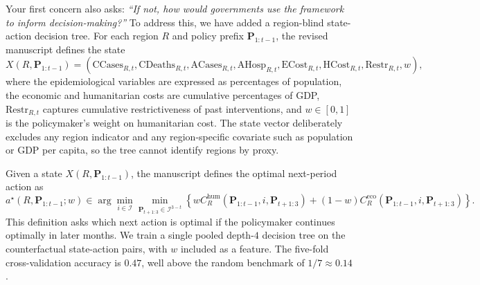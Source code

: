 \documentclass[letterpaper,twoside,11pt]{reviewresponse}
\begin{document}
Your first concern also asks: \emph{``If not, how would governments use the framework to inform decision-making?''} To address this, we have added a region-blind state-action decision tree. For each region $R$ and policy prefix $\bm{P}_{1:t-1}$, the revised manuscript defines the state
\[
X(R,\bm{P}_{1:t-1})
=
\left(
\mathrm{CCases}_{R,t},
\mathrm{CDeaths}_{R,t},
\mathrm{ACases}_{R,t},
\mathrm{AHosp}_{R,t},
\mathrm{ECost}_{R,t},
\mathrm{HCost}_{R,t},
\mathrm{Restr}_{R,t},
w
\right),
\]
where the epidemiological variables are expressed as percentages of population, the economic and humanitarian costs are cumulative percentages of GDP, $\mathrm{Restr}_{R,t}$ captures cumulative restrictiveness of past interventions, and $w\in[0,1]$ is the policymaker's weight on humanitarian cost. The state vector deliberately excludes any region indicator and any region-specific covariate such as population or GDP per capita, so the tree cannot identify regions by proxy.

Given a state $X(R,\bm{P}_{1:t-1})$, the manuscript defines the optimal next-period action as
\[
a^\star(R,\bm{P}_{1:t-1};w)
\in \arg\min_{i\in\mathcal{I}}
\min_{\bm{P}_{t+1:3}\in\mathcal{I}^{3-t}}
\left\{
w C^{\mathrm{hum}}_R(\bm{P}_{1:t-1},i,\bm{P}_{t+1:3})
+(1-w)C^{\mathrm{eco}}_R(\bm{P}_{1:t-1},i,\bm{P}_{t+1:3})
\right\}.
\]
This definition asks which next action is optimal if the policymaker continues optimally in later months. We train a single pooled depth-$4$ decision tree on the counterfactual state-action pairs, with $w$ included as a feature. The five-fold cross-validation accuracy is $0.47$, well above the random benchmark of $1/7\approx0.14$.
\end{document}
